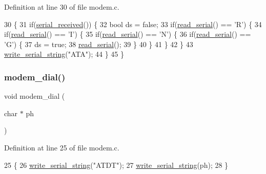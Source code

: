 Definition at line 30 of file modem.\+c.


\begin{DoxyCode}
30                      \{
31     \textcolor{keywordflow}{if}(\hyperlink{a00056_af10f0e64ba89e8635aa7245ca08297c5_af10f0e64ba89e8635aa7245ca08297c5}{serial\_received}()) \{
32         \textcolor{keywordtype}{bool} ds = \textcolor{keyword}{false};
33         \textcolor{keywordflow}{if}(\hyperlink{a00056_ad343a7018f74662f794968dfa0523841_ad343a7018f74662f794968dfa0523841}{read\_serial}() == \textcolor{charliteral}{'R'}) \{
34             \textcolor{keywordflow}{if}(\hyperlink{a00056_ad343a7018f74662f794968dfa0523841_ad343a7018f74662f794968dfa0523841}{read\_serial}() == \textcolor{charliteral}{'I'}) \{
35                 \textcolor{keywordflow}{if}(\hyperlink{a00056_ad343a7018f74662f794968dfa0523841_ad343a7018f74662f794968dfa0523841}{read\_serial}() == \textcolor{charliteral}{'N'}) \{
36                     \textcolor{keywordflow}{if}(\hyperlink{a00056_ad343a7018f74662f794968dfa0523841_ad343a7018f74662f794968dfa0523841}{read\_serial}() == \textcolor{charliteral}{'G'}) \{
37                         ds = \textcolor{keyword}{true};
38                         \hyperlink{a00056_ad343a7018f74662f794968dfa0523841_ad343a7018f74662f794968dfa0523841}{read\_serial}();
39                     \}
40                 \}
41             \}
42         \}
43         \hyperlink{a00056_aabbe45d6670f606c53ba38a5fb14b650_aabbe45d6670f606c53ba38a5fb14b650}{write\_serial\_string}(\textcolor{stringliteral}{"ATA"});
44     \}
45 \}
\end{DoxyCode}
\mbox{\label{a00044_ab1123a026be8f7d0ece72e2813222da0_ab1123a026be8f7d0ece72e2813222da0}} 
\subsubsection{\texorpdfstring{modem\+\_\+dial()}{modem\_dial()}}
{\footnotesize\ttfamily void modem\+\_\+dial (\begin{DoxyParamCaption}\item[{char $\ast$}]{ph }\end{DoxyParamCaption})}



Definition at line 25 of file modem.\+c.


\begin{DoxyCode}
25                           \{
26     \hyperlink{a00056_aabbe45d6670f606c53ba38a5fb14b650_aabbe45d6670f606c53ba38a5fb14b650}{write\_serial\_string}(\textcolor{stringliteral}{"ATDT"});
27     \hyperlink{a00056_aabbe45d6670f606c53ba38a5fb14b650_aabbe45d6670f606c53ba38a5fb14b650}{write\_serial\_string}(ph);
28 \}
\end{DoxyCode}



